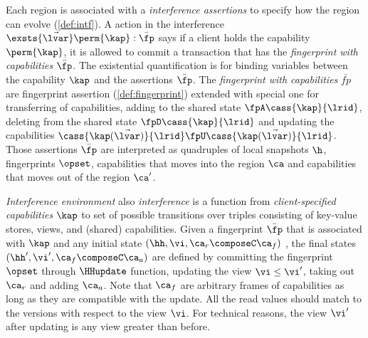 Each region is associated with a \emph{interference assertions} to specify how the region can evolve (\cref{def:intf}).
A action in the interference \( \exsts{\vec{\lvar}} \perm{\kap} : \bar{\fp} \) says if a client holds the capability \( \perm{\kap} \), it is allowed to commit a transaction that has the \emph{fingerprint with capabilities} \( \bar{\fp} \).
The existential quantification is for binding variables between the capability \( \kap \) and the assertions \( \bar{\fp}\).
The \emph{fingerprint with capabilities} \( \bar{fp} \) are fingerprint assertion (\cref{def:fingerprint}) extended with special one for transferring of capabilities, \ie adding to the shared state \( \fpA \cass{\kap}{\lrid} \), deleting from the shared state \( \fpD \cass{\kap}{\lrid} \) and updating the capabilities \( \cass{\kap(\vec{\lvar})}{\lrid} \fpU \cass{\kap(\vec{\lvar})}{\lrid} \). 
Those assertions \( \bar{\fp} \) are interpreted as quadruples of local snapshots \( \h \), fingerprints \( \opset \), capabilities that moves into the region \( \ca \) and capabilities that moves out of the region \( \ca' \).

\emph{Interference environment} also \emph{interference} is a function from \emph{client-specified capabilities} \( \kap \) to set of possible transitions over triples consisting of key-value stores, views, and (shared) capabilities. 
Given a fingerprint \( \bar{\fp} \) that is associated with \( \kap \) and any initial state \( (\hh, \vi, \ca_r \composeC \ca_f ) \) , the final states \( (\hh',\vi', \ca_f \composeC \ca_a) \) are defined by committing the fingerprint \( \opset \) through \( \HHupdate \) function, updating the view \( \vi \leq \vi' \), taking out \( \ca_r \) and adding \( \ca_a \).
Note that \( \ca_f \) are arbitrary frames of capabilities as long as they are compatible with the update.
All the read values should match to the versions with respect to the view \( \vi \).
For technical reasons, the view \( \vi' \) after updating is any view greater than before.

